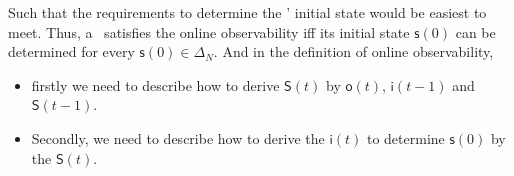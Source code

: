 Such that the requirements to determine the \BCNs' initial state would be easiest to meet. Thus, a \BCN\ satisfies the online observability iff its initial state $\mathsf{s}(0)$ can be determined for every $\mathsf{s}(0) \in \Delta_N$. And in the definition of online observability, 

\begin{itemize}
\item firstly we need to describe how to derive $\mathsf{S}(t)$ by $\mathsf{o}(t)$, $\mathsf{i}(t-1)$ and $\mathsf{S}(t-1)$. %
\item  Secondly, we need to describe how to derive the $\mathsf{i}(t)$ to determine $\mathsf{s}(0)$ by the $\mathsf{S}(t)$. %
\end{itemize} 

